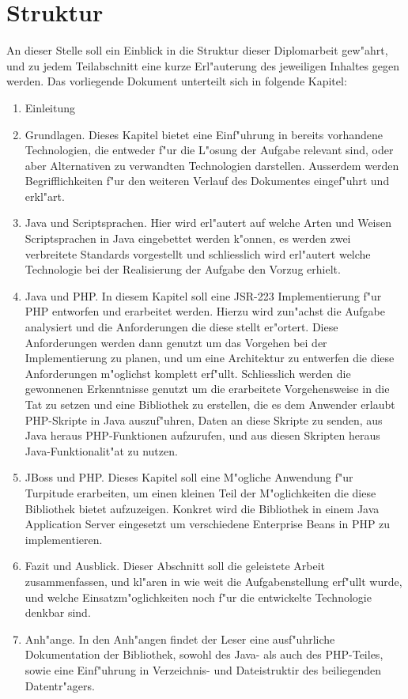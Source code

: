 \clearpage

\section{Struktur}
\label{sec:intro:structure}

An dieser Stelle soll ein Einblick in die Struktur dieser Diplomarbeit gew"ahrt, und zu jedem Teilabschnitt eine
kurze Erl"auterung des jeweiligen Inhaltes gegen werden.
Das vorliegende Dokument unterteilt sich in folgende Kapitel:

\begin{enumerate}
    \item Einleitung
    \item Grundlagen. Dieses Kapitel bietet eine Einf"uhrung in bereits vorhandene Technologien, die entweder
    f"ur die L"osung der Aufgabe relevant sind, oder aber Alternativen zu verwandten Technologien darstellen.
    Ausserdem werden Begrifflichkeiten f"ur den weiteren Verlauf des Dokumentes eingef"uhrt und erkl"art.
    \item Java und Scriptsprachen. Hier wird erl"autert auf welche Arten und Weisen Scriptsprachen in Java
    eingebettet werden k"onnen, es werden zwei verbreitete Standards vorgestellt und schliesslich wird
    erl"autert welche Technologie bei der Realisierung der Aufgabe den Vorzug erhielt.
    \item Java und PHP. In diesem Kapitel soll eine JSR-223 Implementierung f"ur PHP entworfen und erarbeitet werden. Hierzu wird zun"achst
    die Aufgabe analysiert und die Anforderungen die diese stellt er"ortert. Diese Anforderungen werden dann genutzt
    um das Vorgehen bei der Implementierung zu planen, und um eine Architektur zu entwerfen die diese Anforderungen
    m"oglichst komplett erf"ullt. Schliesslich werden die gewonnenen Erkenntnisse genutzt um die erarbeitete Vorgehensweise
    in die Tat zu setzen und eine Bibliothek zu erstellen, die es dem Anwender erlaubt PHP-Skripte in Java auszuf"uhren,
    Daten an diese Skripte zu senden, aus Java heraus PHP-Funktionen aufzurufen, und aus diesen Skripten heraus 
    Java-Funktionalit"at zu nutzen.
    \item JBoss und PHP. Dieses Kapitel soll eine M"ogliche Anwendung f"ur Turpitude erarbeiten, 
    um einen kleinen Teil der M"oglichkeiten die diese Bibliothek bietet aufzuzeigen. Konkret wird die Bibliothek
    in einem Java Application Server eingesetzt um verschiedene Enterprise Beans in PHP zu implementieren.
    \item Fazit und Ausblick. Dieser Abschnitt soll die geleistete Arbeit zusammenfassen, und
    kl"aren in wie weit die Aufgabenstellung erf"ullt wurde,
    und welche Einsatzm"oglichkeiten noch f"ur die entwickelte Technologie denkbar sind.
    \item Anh"ange. In den Anh"angen findet der Leser eine ausf"uhrliche Dokumentation der Bibliothek, sowohl des
    Java- als auch des PHP-Teiles, sowie eine Einf"uhrung in Verzeichnis- und Dateistruktir des beiliegenden
    Datentr"agers.
\end{enumerate}


